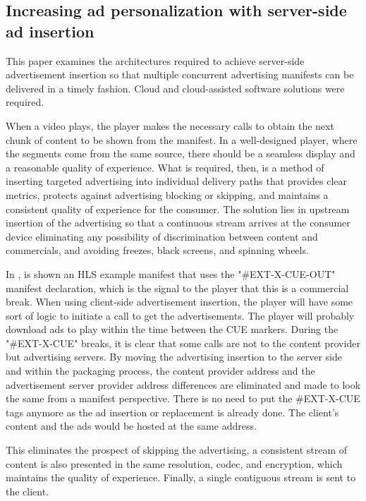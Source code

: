 \subsection{Increasing ad personalization with server-side ad insertion}

This paper \cite{ssai} examines the architectures required to achieve server-side advertisement insertion so that multiple concurrent advertising manifests can be delivered in a timely fashion. Cloud and cloud-assisted software solutions were required. 

When a video plays, the player makes the necessary calls to obtain the next chunk of content to be shown from the manifest. In a well-designed player, where the segments come from the same source, there should be a seamless display and a reasonable quality of experience. What is required, then, is a method of inserting targeted advertising into individual delivery paths that provides clear metrics, protects against advertising blocking or skipping, and maintains a consistent quality of experience for the consumer. The solution lies in upstream insertion of the advertising so that a continuous stream arrives at the consumer device eliminating any possibility of discrimination between content and commercials, and avoiding freezes, black screens, and spinning wheels.

In \cite{ssai}, is shown an HLS example manifest that uses the "\#EXT-X-CUE-OUT" manifest declaration, which is the signal to the player that this is a commercial break. When using client-side advertisement insertion, the player will have some sort of logic to initiate a call to get the advertisements. The player will probably download ads to play within the time between the CUE markers. During the "\#EXT-X-CUE" breaks, it is clear that some calls are not to the content provider but advertising servers. By moving the advertising insertion to the server side and within the packaging process, the content provider address and the advertisement server provider address differences are eliminated and made to look the same from a manifest perspective. There is no need to put the \#EXT-X-CUE tags anymore as the ad insertion or replacement is already done. The client's content and the ads would be hosted at the same address. 

This eliminates the prospect of skipping the advertising, a consistent stream of content is also presented in the same resolution, codec, and encryption, which maintains the quality of experience. Finally, a single contiguous stream is sent to the client.